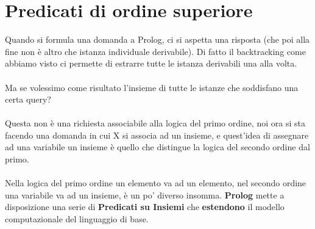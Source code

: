 \documentclass[12pt, a4paper, openany, oneside]{book}
\begin{document}
\section{Predicati di ordine superiore}
Quando si formula una domanda a Prolog, ci si aspetta una risposta (che poi
alla fine non è altro che istanza individuale derivabile).
Di fatto il backtracking come abbiamo visto ci permette di estrarre tutte le 
istanza derivabili una alla volta.\\ \\
Ma se volessimo come risultato l'insieme di tutte le istanze che soddisfano una
certa query?\\ \\
Questa non è una richiesta associabile alla logica del primo ordine, noi ora
si sta facendo una domanda in cui X si associa ad un insieme, e quest'idea di 
assegnare ad una variabile un insieme è quello che distingue la logica del secondo
ordine dal primo.\\ \\
Nella logica del primo ordine un elemento va ad un elemento, nel secondo ordine 
una variabile va ad un insieme, è un po' diverso insomma.
\textbf{Prolog} mette a disposizione una serie di \textbf{Predicati su Insiemi}
che \textbf{estendono} il \color{red}modello  \color{black} computazionale
del linguaggio di base.
\end{document}
